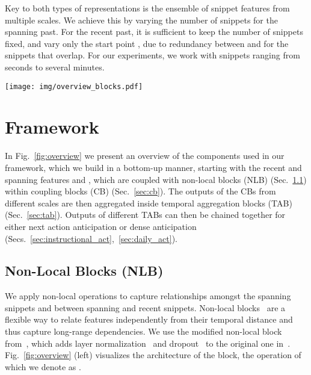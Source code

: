 \documentclass[runningheads]{llncs}
\begin{document}
Key to both types of representations is the ensemble of snippet features from multiple scales. We achieve this by varying the number of snippets  for the spanning past. For the recent past, it is sufficient to keep the number of snippets  fixed, and vary only the start point , due to redundancy between  and  for the snippets that overlap. For our experiments, we work with snippets ranging from seconds to several minutes.

\begin{figure*}[!t] 
\centering 
\texttt{[image: img/overview\_blocks.pdf]} 
\caption{Model components: Non-Local Blocks (NLB) compute interactions between two representations via attention (Sec.~\ref{sec:nlb}). Two such NLBs are combined in a Coupling Block (CB), which calculates the attention-reweighted spanning and recent representations (Sec.~\ref{sec:cb}). We couple each recent with all spanning representations via individual CBs and combine their outputs in a Temporal Aggregation Block (TAB) (Sec.~\ref{sec:tab}). The outputs of multiple such TABs are combined to perform anticipation,  Fig.~\ref{fig:overview_new}.}
\label{fig:overview} 
\end{figure*} 

\section{Framework}
In Fig.~\ref{fig:overview} we present an overview of the components used in our framework, which we build in a bottom-up manner, starting with the recent and spanning features  and , which are coupled with non-local blocks (NLB) (Sec.~\ref{sec:nlb}) within coupling blocks (CB) (Sec.~\ref{sec:cb}). The outputs of the CBs from different scales are then aggregated inside temporal aggregation blocks (TAB) (Sec.~\ref{sec:tab}). Outputs of different TABs can then be chained together for either next action anticipation or dense anticipation (Secs.~\ref{sec:instructional_act},~\ref{sec:daily_act}).

\subsection{Non-Local Blocks (NLB)}\label{sec:nlb} 
We apply non-local operations to capture relationships amongst the spanning snippets and between spanning and recent snippets. Non-local blocks~\cite{wang2018non} are a flexible way to relate features independently from their temporal distance and thus capture long-range dependencies. We use the modified non-local block from~\cite{lfb2019}, which adds layer normalization~\cite{ba2016layer} and dropout~\cite{srivastava2014dropout} to the original one in~\cite{wang2016temporal}.   Fig.~\ref{fig:overview} (left) visualizes the architecture of the block, the operation of which we denote as .
\end{document}
